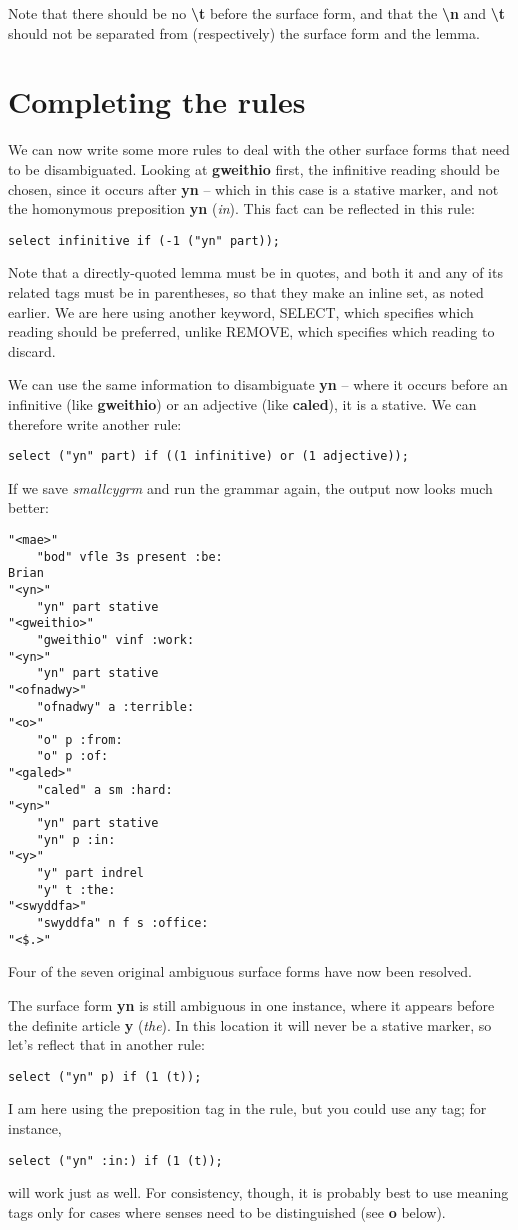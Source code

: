 \documentclass[a4paper,10pt]{article}
\begin{document}
Note that there should be no \textbf{\textbackslash t} before the surface form, and that the \textbf{\textbackslash n} and \textbf{\textbackslash t} should not be separated from (respectively) the surface form and the lemma.

\section{Completing the rules}

We can now write some more rules to deal with the other surface forms that need to be disambiguated.  Looking at \textbf{gweithio} first, the infinitive reading should be chosen, since it occurs after \textbf{yn} -- which in this case is a stative marker, and not the homonymous preposition \textbf{yn} (\textit{in}).  This fact can be reflected in this rule:
\begin{Verbatim}[tabsize=4]
select infinitive if (-1 ("yn" part));
\end{Verbatim}
Note that a directly-quoted lemma must be in quotes, and both it and any of its related tags must be in parentheses, so that they make an inline set, as noted earlier.  We are here using another keyword, SELECT, which specifies which reading should be preferred, unlike REMOVE, which specifies which reading to discard.

We can use the same information to disambiguate \textbf{yn} -- where it occurs before an infinitive (like \textbf{gweithio}) or an adjective (like \textbf{caled}), it is a stative.  We can therefore write another rule:
\begin{Verbatim}[tabsize=4]
select ("yn" part) if ((1 infinitive) or (1 adjective));
\end{Verbatim}

If we save \textit{smallcygrm} and run the grammar again, the output now looks much better:
\begin{Verbatim}[tabsize=4]
"<mae>"
	"bod" vfle 3s present :be:
Brian
"<yn>"
	"yn" part stative
"<gweithio>"
	"gweithio" vinf :work:
"<yn>"
	"yn" part stative
"<ofnadwy>"
	"ofnadwy" a :terrible:
"<o>"
	"o" p :from:
	"o" p :of:
"<galed>"
	"caled" a sm :hard:
"<yn>"
	"yn" part stative
	"yn" p :in:
"<y>"
	"y" part indrel
	"y" t :the:
"<swyddfa>"
	"swyddfa" n f s :office:
"<$.>"
\end{Verbatim}
Four of the seven original ambiguous surface forms have now been resolved.

The surface form \textbf{yn} is still ambiguous in one instance, where it appears before the definite article \textbf{y} (\textit{the}).  In this location it will never be a stative marker, so let's reflect that in another rule:
\begin{Verbatim}[tabsize=4]
select ("yn" p) if (1 (t));
\end{Verbatim}
I am here using the preposition tag in the rule, but you could use any tag; for instance,
\begin{Verbatim}[tabsize=4]
select ("yn" :in:) if (1 (t));
\end{Verbatim}
will work just as well.  For consistency, though, it is probably best to use meaning tags only for cases where senses need to be distinguished (see \textbf{o} below).
\end{document}
